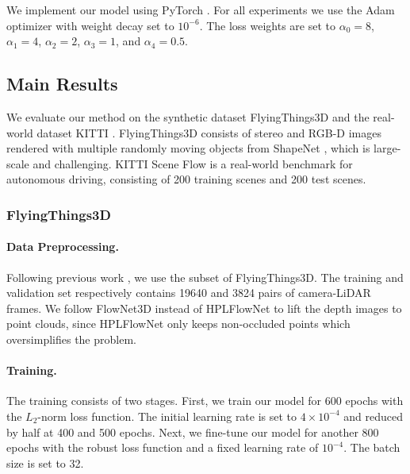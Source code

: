 \documentclass[10pt,twocolumn,letterpaper]{article}
\begin{document}
We implement our model using PyTorch \cite{paszke2019pytorch}. For all experiments we use the Adam optimizer \cite{kingma2014adam} with weight decay set to $10^{-6}$. The loss weights are set to $\alpha_0=8$, $\alpha_1=4$, $\alpha_2=2$, $\alpha_3=1$, and $\alpha_4=0.5$.

\subsection{Main Results}

We evaluate our method on the synthetic dataset FlyingThings3D \cite{mayer2016things3d} and the real-world dataset KITTI \cite{menze2015osf}. FlyingThings3D consists of stereo and RGB-D images rendered with multiple randomly moving objects from ShapeNet \cite{chang2015shapenet}, which is large-scale and challenging. KITTI Scene Flow is a real-world benchmark for autonomous driving, consisting of 200 training scenes and 200 test scenes.

\subsubsection{FlyingThings3D}

\paragraph{Data Preprocessing.} Following previous work \cite{ilg2017flownet2, gu2019hplflownet, wu2019pointpwc}, we use the subset of FlyingThings3D. The training and validation set respectively contains 19640 and 3824 pairs of camera-LiDAR frames. We follow FlowNet3D \cite{liu2019flownet3d} instead of HPLFlowNet \cite{gu2019hplflownet} to lift the depth images to point clouds, since HPLFlowNet only keeps non-occluded points which oversimplifies the problem. 

\vspace{-10pt}
\paragraph{Training.} The training consists of two stages. First, we train our model for 600 epochs with the $L_2$-norm loss function. The initial learning rate is set to $4 \times 10^{-4}$ and reduced by half at 400 and 500 epochs. Next, we fine-tune our model for another 800 epochs with the robust loss function and a fixed learning rate of $10^{-4}$. The batch size is set to 32.

\vspace{-10pt}
\end{document}
